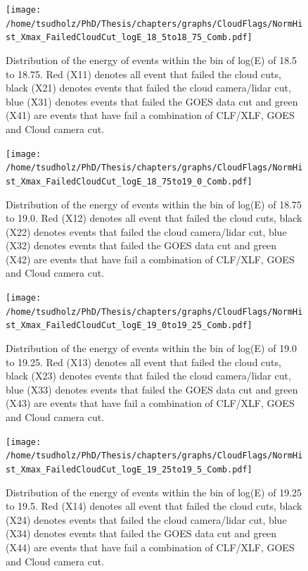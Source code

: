 \begin{figure}
\centering
\texttt{[image: /home/tsudholz/PhD/Thesis/chapters/graphs/CloudFlags/NormHist\_Xmax\_FailedCloudCut\_logE\_18\_5to18\_75\_Comb.pdf]}
\caption{Distribution of the energy of events within the bin of log(E) of 18.5 to 18.75. Red (X11) denotes all event that failed the cloud cuts, black (X21) denotes events that failed the cloud camera/lidar cut, blue (X31) denotes events that failed the GOES data cut and green (X41) are events that have fail a combination of CLF/XLF, GOES and Cloud camera cut.}
\end{figure}

\begin{figure}
\centering
\texttt{[image: /home/tsudholz/PhD/Thesis/chapters/graphs/CloudFlags/NormHist\_Xmax\_FailedCloudCut\_logE\_18\_75to19\_0\_Comb.pdf]}
\caption{Distribution of the energy of events within the bin of log(E) of 18.75 to 19.0. Red (X12) denotes all event that failed the cloud cuts, black (X22) denotes events that failed the cloud camera/lidar cut, blue (X32) denotes events that failed the GOES data cut and green (X42) are events that have fail a combination of CLF/XLF, GOES and Cloud camera cut.}
\end{figure}

\begin{figure}
\centering
\texttt{[image: /home/tsudholz/PhD/Thesis/chapters/graphs/CloudFlags/NormHist\_Xmax\_FailedCloudCut\_logE\_19\_0to19\_25\_Comb.pdf]}
\caption{Distribution of the energy of events within the bin of log(E) of 19.0 to 19.25. Red (X13) denotes all event that failed the cloud cuts, black (X23) denotes events that failed the cloud camera/lidar cut, blue (X33) denotes events that failed the GOES data cut and green (X43) are events that have fail a combination of CLF/XLF, GOES and Cloud camera cut.}
\end{figure}

\begin{figure}
\centering
\texttt{[image: /home/tsudholz/PhD/Thesis/chapters/graphs/CloudFlags/NormHist\_Xmax\_FailedCloudCut\_logE\_19\_25to19\_5\_Comb.pdf]}
\caption{Distribution of the energy of events within the bin of log(E) of 19.25 to 19.5. Red (X14) denotes all event that failed the cloud cuts, black (X24) denotes events that failed the cloud camera/lidar cut, blue (X34) denotes events that failed the GOES data cut and green (X44) are events that have fail a combination of CLF/XLF, GOES and Cloud camera cut.}
\end{figure}

